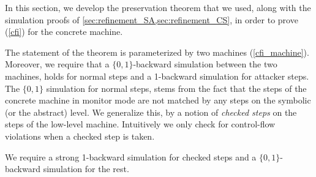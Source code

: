 In this section, we develop the preservation theorem that we used,
along with the simulation proofs of
\cref{sec:refinement_SA,sec:refinement_CS}, in order to prove \CFI
(\cref{cfi}) for the concrete machine.

The statement of the theorem is parameterized by two \CFI machines
(\cref{cfi_machine}). Moreover, we require that a $\lbrace 0,1
\rbrace$-backward simulation between the two machines, holds for
normal steps and a 1-backward simulation for attacker steps.  The
$\lbrace 0,1 \rbrace$ simulation for normal steps, stems from the fact
that the steps of the concrete machine in monitor mode are not matched
by any steps on the symbolic (or the abstract) level. We generalize
this, by a notion of \emph{checked steps} on the steps of the
low-level machine. Intuitively we only check for control-flow
violations when a checked step is taken.

We require a strong 1-backward simulation for checked steps and
a $\lbrace 0,1 \rbrace$-backward simulation for the rest.

